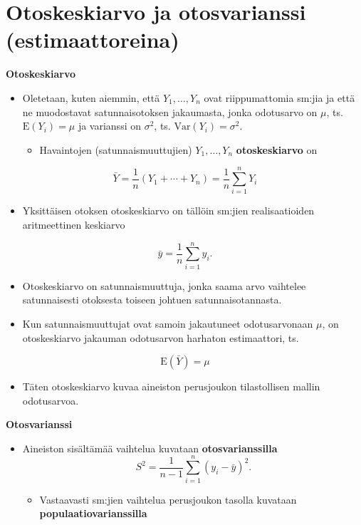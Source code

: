 \documentclass[
]{book}
\providecommand{\tightlist}{%
  \setlength{\itemsep}{0pt}\setlength{\parskip}{0pt}}
\begin{document}
\hypertarget{alaluku84}{%
\section{Otoskeskiarvo ja otosvarianssi (estimaattoreina)}\label{alaluku84}}

\textbf{Otoskeskiarvo}

\begin{itemize}
\tightlist
\item
  Oletetaan, kuten aiemmin, että \(Y_1,\ldots,Y_n\) ovat riippumattomia sm:jia ja että ne muodostavat satunnaisotoksen jakaumasta, jonka odotusarvo on \(\mu\), ts. \(\text{E}(Y_i) = \mu\) ja varianssi on \(\sigma^2\), ts. \(\text{Var}(Y_i) = \sigma^2\).

  \begin{itemize}
  \tightlist
  \item
    Havaintojen (satunnaismuuttujien) \(Y_1, \ldots, Y_n\) \textbf{otoskeskiarvo} on
  \end{itemize}
\end{itemize}

\[
\bar{Y} = \frac{1}{n}(Y_1 + \cdots + Y_n) = \frac{1}{n} \sum_{i=1}^{n} Y_i
\]

\begin{itemize}
\tightlist
\item
  Yksittäisen otoksen otoskeskiarvo on tällöin sm:jien realisaatioiden aritmeettinen keskiarvo
\end{itemize}

\[
\bar{y} = \frac{1}{n} \sum_{i=1}^{n} y_i.
\]

\begin{itemize}
\tightlist
\item
  Otoskeskiarvo on satunnaismuuttuja, jonka saama arvo vaihtelee satunnaisesti otoksesta toiseen johtuen satunnaisotannasta.
\item
  Kun satunnaismuuttujat ovat samoin jakautuneet odotusarvonaan \(\mu\), on otoskeskiarvo jakauman odotusarvon harhaton estimaattori, ts.
\end{itemize}

\[\text{E}(\bar{Y}) = \mu\]

\begin{itemize}
\tightlist
\item
  Täten otoskeskiarvo kuvaa aineiston perusjoukon tilastollisen mallin odotusarvoa.
\end{itemize}

\textbf{Otosvarianssi}

\begin{itemize}
\item
  Aineiston sisältämää vaihtelua kuvataan \textbf{otosvarianssilla}
  \[
  S^2= \frac{1}{n-1} \sum_{i=1}^{n} (y_i - \bar{y})^2.
  \]

  \begin{itemize}
  \tightlist
  \item
    Vastaavasti sm:jien vaihtelua perusjoukon tasolla kuvataan \textbf{populaatiovarianssilla}
  \end{itemize}
\end{itemize}
\end{document}
